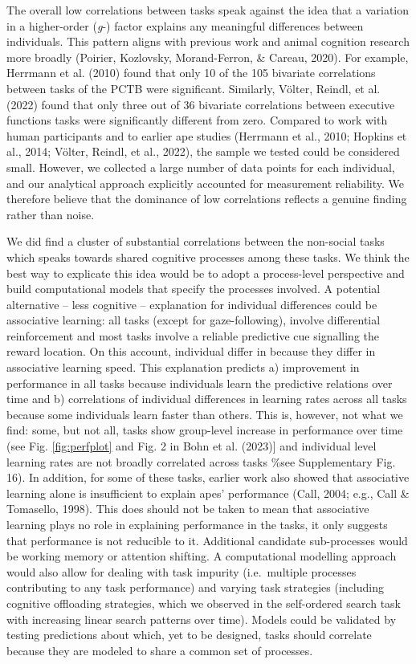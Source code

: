\documentclass[
  man,floatsintext]{apa6}
\begin{document}
The overall low correlations between tasks speak against the idea that a variation in a higher-order (\emph{g}-) factor explains any meaningful differences between individuals. This pattern aligns with previous work and animal cognition research more broadly (Poirier, Kozlovsky, Morand-Ferron, \& Careau, 2020). For example, Herrmann et al. (2010) found that only 10 of the 105 bivariate correlations between tasks of the PCTB were significant. Similarly, Völter, Reindl, et al. (2022) found that only three out of 36 bivariate correlations between executive functions tasks were significantly different from zero. Compared to work with human participants and to earlier ape studies (Herrmann et al., 2010; Hopkins et al., 2014; Völter, Reindl, et al., 2022), the sample we tested could be considered small. However, we collected a large number of data points for each individual, and our analytical approach explicitly accounted for measurement reliability. We therefore believe that the dominance of low correlations reflects a genuine finding rather than noise.

We did find a cluster of substantial correlations between the non-social tasks which speaks towards shared cognitive processes among these tasks. We think the best way to explicate this idea would be to adopt a process-level perspective and build computational models that specify the processes involved. A potential alternative -- less cognitive -- explanation for individual differences could be associative learning: all tasks (except for gaze-following), involve differential reinforcement and most tasks involve a reliable predictive cue signalling the reward location. On this account, individual differ in because they differ in associative learning speed. This explanation predicts a) improvement in performance in all tasks because individuals learn the predictive relations over time and b) correlations of individual differences in learning rates across all tasks because some individuals learn faster than others. This is, however, not what we find: some, but not all, tasks show group-level increase in performance over time (see Fig. \ref{fig:perfplot} and Fig. 2 in Bohn et al. (2023){]} and individual level learning rates are not broadly correlated across tasks \%see Supplementary Fig. 16). In addition, for some of these tasks, earlier work also showed that associative learning alone is insufficient to explain apes' performance (Call, 2004; e.g., Call \& Tomasello, 1998). This does should not be taken to mean that associative learning plays no role in explaining performance in the tasks, it only suggests that performance is not reducible to it. Additional candidate sub-processes would be working memory or attention shifting. A computational modelling approach would also allow for dealing with task impurity (i.e.~multiple processes contributing to any task performance) and varying task strategies (including cognitive offloading strategies, which we observed in the self-ordered search task with increasing linear search patterns over time). Models could be validated by testing predictions about which, yet to be designed, tasks should correlate because they are modeled to share a common set of processes.
\end{document}
